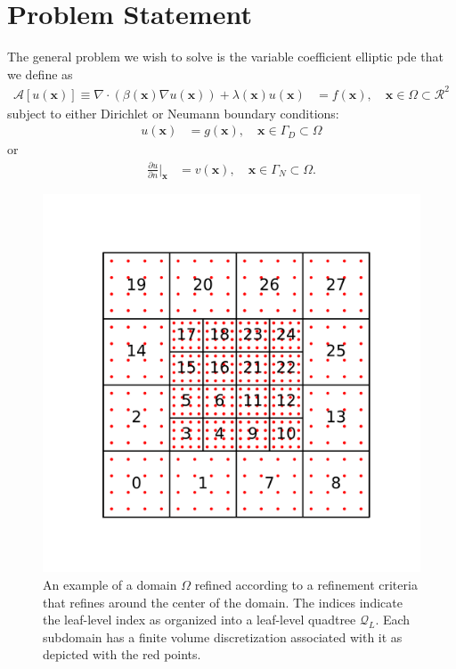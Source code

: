 \section{Problem Statement}
\label{sec:problem-statement}

The general problem we wish to solve is the variable coefficient elliptic \gls{pde} that we define as
\begin{align}
    \label{eq:elliptic-pde}
    \mathcal{A}[u(\textbf{x})] \equiv \nabla \cdot \left( \beta(\textbf{x}) \nabla u(\textbf{x}) \right) + \lambda(\textbf{x}) u(\textbf{x}) &= f(\textbf{x}), \quad \textbf{x} \in \Omega \subset \mathcal{R}^2
\end{align}
subject to either Dirichlet or Neumann boundary conditions:
\begin{align}
    \label{eq:elliptic-pde-bc1}
    u(\textbf{x}) &= g(\textbf{x}), \quad \textbf{x} \in \Gamma_D \subset \Omega
\end{align}
or
\begin{align}
    \label{eq:elliptic-pde-bc2}
    \frac{\partial u}{\partial n} \Big|_{\textbf{x}} &= v(\textbf{x}), \quad \textbf{x} \in \Gamma_N \subset \Omega.
\end{align}

\begin{figure}
    \centering
    \includegraphics[width=\textwidth, clip=true, trim={0 160 0 160}]{figures/adaptive-mesh-serial.pdf}
    \caption{An example of a domain $\Omega$ refined according to a refinement criteria that refines around the center of the domain. The indices indicate the leaf-level index as organized into a leaf-level quadtree $\mathcal{Q}_L$. Each subdomain has a finite volume discretization associated with it as depicted with the red points.}
    \label{fig:adaptive-mesh-serial}
\end{figure}

